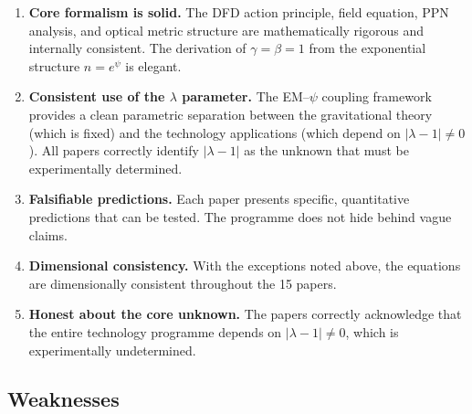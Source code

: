 \documentclass[12pt,a4paper]{article}
\begin{document}
\begin{enumerate}[nosep]
\item \textbf{Core formalism is solid.} The DFD action principle, field
equation, PPN analysis, and optical metric structure are mathematically
rigorous and internally consistent. The derivation of $\gamma = \beta = 1$
from the exponential structure $n = e^\psi$ is elegant.

\item \textbf{Consistent use of the $\lambda$ parameter.} The EM--$\psi$
coupling framework provides a clean parametric separation between the
gravitational theory (which is fixed) and the technology applications
(which depend on $|\lambda-1| \neq 0$). All papers correctly identify
$|\lambda - 1|$ as the unknown that must be experimentally determined.

\item \textbf{Falsifiable predictions.} Each paper presents specific,
quantitative predictions that can be tested. The programme does not
hide behind vague claims.

\item \textbf{Dimensional consistency.} With the exceptions noted above,
the equations are dimensionally consistent throughout the 15 papers.

\item \textbf{Honest about the core unknown.} The papers correctly
acknowledge that the entire technology programme depends on
$|\lambda - 1| \neq 0$, which is experimentally undetermined.
\end{enumerate}

\subsection{Weaknesses}
\end{document}
